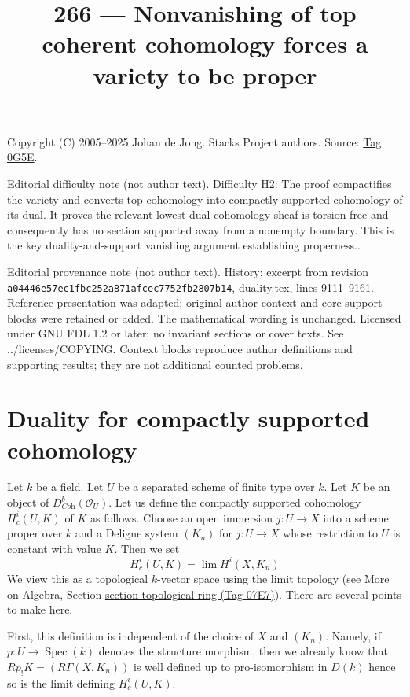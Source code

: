 \documentclass{amsart}
\theoremstyle{plain}
\theoremstyle{definition}
\theoremstyle{remark}
\numberwithin{equation}{subsection}
\def\lim{\mathop{\mathrm{lim}}\nolimits}
\def\Spec{\mathop{\mathrm{Spec}}}
\begin{document}
\title[Stacks Project, Tag 0G5E]{266 --- Nonvanishing of top coherent cohomology forces a variety to be proper}
\maketitle
\noindent Copyright (C) 2005--2025 Johan de Jong. Stacks Project authors. Source: \href{https://stacks.math.columbia.edu/tag/0G5E}{Tag 0G5E}.

\noindent Editorial difficulty note (not author text). Difficulty H2: The proof compactifies the variety and converts top cohomology into compactly supported cohomology of its dual. It proves the relevant lowest dual cohomology sheaf is torsion-free and consequently has no section supported away from a nonempty boundary. This is the key duality-and-support vanishing argument establishing properness..

\noindent Editorial provenance note (not author text). History: excerpt from revision \texttt{a0444\allowbreak 6e57e\allowbreak c1fbc\allowbreak 252a8\allowbreak 71afc\allowbreak ec775\allowbreak 2fb28\allowbreak 07b14}, duality.tex, lines 9111--9161. Reference presentation was adapted; original-author context and core support blocks were retained or added. The mathematical wording is unchanged. Licensed under GNU FDL 1.2 or later; no invariant sections or cover texts. See ../licenses/COPYING. Context blocks reproduce author definitions and supporting results; they are not additional counted problems.

\section{Duality for compactly supported cohomology}
\label{section-duality-compactly-supported}

\noindent
Let $k$ be a field. Let $U$ be a separated scheme of finite type over $k$.
Let $K$ be an object of $D^b_{\textit{Coh}}(\mathcal{O}_U)$. Let us define
the compactly supported cohomology $H^i_c(U, K)$ of $K$ as follows.
Choose an open immersion $j : U \to X$ into a scheme proper over $k$
and a Deligne system $(K_n)$ for $j : U \to X$ whose restriction
to $U$ is constant with value $K$. Then we set
$$
H^i_c(U, K) = \lim H^i(X, K_n)
$$
We view this as a topological $k$-vector space using the limit topology
(see More on Algebra, Section \href{https://stacks.math.columbia.edu/tag/07E7}{section topological ring (Tag 07E7)}).
There are several points to make here.

\medskip\noindent
First, this definition is independent of the choice of $X$ and $(K_n)$.
Namely, if $p : U \to \Spec(k)$ denotes the structure morphism, then
we already know that $Rp_!K = (R\Gamma(X, K_n))$
is well defined up to pro-isomorphism in $D(k)$ hence so is the limit
defining $H^i_c(U, K)$.
\end{document}
